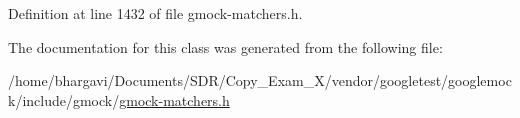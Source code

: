 Definition at line 1432 of file gmock-\/matchers.\+h.



The documentation for this class was generated from the following file\+:\begin{DoxyCompactItemize}
\item 
/home/bhargavi/\+Documents/\+S\+D\+R/\+Copy\+\_\+\+Exam\+\_\+X/vendor/googletest/googlemock/include/gmock/\hyperlink{gmock-matchers_8h}{gmock-\/matchers.\+h}\end{DoxyCompactItemize}
